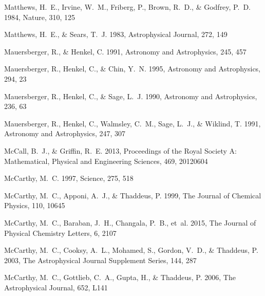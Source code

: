 \documentclass[twocolumn]{aastex631}
\begin{document}
\begin{thebibliography}{}
Matthews, H.~E., Irvine, W.~M., Friberg, P., Brown, R.~D., \& Godfrey, P.~D.
  1984, Nature, 310, 125

Matthews, H.~E., \& Sears, T.~J. 1983, Astrophysical Journal, 272, 149

{Mauersberger}, R., \& {Henkel}, C. 1991, Astronomy and Astrophysics, 245, 457

{Mauersberger}, R., {Henkel}, C., \& {Chin}, Y.~N. 1995, Astronomy and
  Astrophysics, 294, 23

{Mauersberger}, R., {Henkel}, C., \& {Sage}, L.~J. 1990, Astronomy and
  Astrophysics, 236, 63

{Mauersberger}, R., {Henkel}, C., {Walmsley}, C.~M., {Sage}, L.~J., \&
  {Wiklind}, T. 1991, Astronomy and Astrophysics, 247, 307

McCall, B.~J., \& Griffin, R.~E. 2013, Proceedings of the Royal Society A:
  Mathematical, Physical and Engineering Sciences, 469, 20120604

McCarthy, M.~C. 1997, Science, 275, 518

McCarthy, M.~C., Apponi, A.~J., \& Thaddeus, P. 1999, The Journal of Chemical
  Physics, 110, 10645

McCarthy, M.~C., Baraban, J.~H., Changala, P.~B., {et~al.} 2015, The Journal of
  Physical Chemistry Letters, 6, 2107

McCarthy, M.~C., Cooksy, A.~L., Mohamed, S., Gordon, V.~D., \& Thaddeus, P.
  2003, The Astrophysical Journal Supplement Series, 144, 287

McCarthy, M.~C., Gottlieb, C.~A., Gupta, H., \& Thaddeus, P. 2006, The
  Astrophysical Journal, 652, L141


\end{thebibliography}
\end{document}
